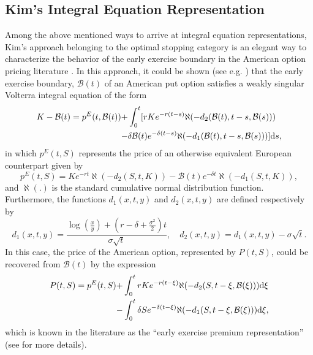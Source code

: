 \documentclass[fleqn,final,3p,11pt]{elsarticle}
\theoremstyle{definition}
\theoremstyle{remark}
\numberwithin{equation}{section}
\begin{document}
\subsection{Kim's Integral Equation Representation} Among the above mentioned ways to arrive at integral equation representations, Kim's approach belonging to the optimal stopping category is an elegant way to characterize the behavior of the early exercise boundary in the American option pricing literature \cite{chia, chiarella2014numerical, kim}. In this approach, it could be shown (see e.g. \cite{chen1,  kim, kim2}) that the early exercise boundary, $\mathcal{B}(t)$ of an American put option satisfies a weakly singular Volterra integral equation of the form
\begin{align}\label{kim}
K-\mathcal{B}(t)=p^{E}(t,\mathcal{B}(t)) +& \int_{0}^{t}[rKe^{-r(t-s)}\aleph(-d_{2}(\mathcal{B}(t),t-s,\mathcal{B}(s)))\\\notag
-&\delta \mathcal{B}(t) e^{-\delta (t-s)}\aleph(-d_{1}(\mathcal{B}(t),t-s,\mathcal{B}(s)))]\mathrm{d}s,
\end{align}
in which $ p^{E}(t, S) $ represents the price of an otherwise equivalent European counterpart given by
\begin{equation}\label{IEs}
p^{E}(t, S)= Ke^{-rt}\aleph(- d_{2}(S,t,K))-\mathcal{B}(t)e^{-\delta t}\aleph(-d_{1}(S,t,K)),
\end{equation}
and $\aleph(.) $ is the standard cumulative normal distribution function. Furthermore, the functions $ d_{1}(x,t,y) $ and $ d_{2}(x,t,y) $ are defined respectively by
\begin{equation}\label{d1d2}
d_{1}(x,t,y) =\frac{\log(\frac{x}{y})+ (r-\delta + \frac{\sigma^{2}}{2})t}{\sigma\sqrt{t}}, \quad d_{2}(x,t,y) = d_{1}(x,t,y) - \sigma \sqrt{t}.
\end{equation}
In this case, the price of the American option, represented by $P(t,S)$, could be recovered from $\mathcal{B}(t)$ by the expression
\begin{align}\label{price}
P(t,S)=p^{E}(t,S) +& \int_{0}^{t}rK e^{-r(t-\xi)}\aleph (-d_{2}(S, t-\xi, \mathcal{B}(\xi)))\mathrm{d}\xi\\
   - &\int_{0}^{t} \delta S e^{-\delta (t- \xi)} \aleph (-d_{1}(S, t- \xi, \mathcal{B}(\xi)))  \mathrm{d}\xi,\notag
\end{align}
which is known in the literature as the ``early exercise premium representation'' (see \cite{kim} for more details).
\end{document}
